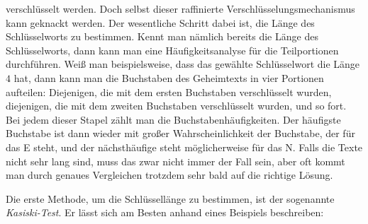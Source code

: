 \documentclass{zusammenfassung}
\begin{document}
verschlüsselt werden. Doch selbst dieser raffinierte Verschlüsselungsmechanismus kann geknackt werden. Der wesentliche Schritt 
dabei ist, die Länge des Schlüsselworts zu bestimmen. Kennt man nämlich bereits die Länge des Schlüsselworts, dann kann man eine
Häufigkeitsanalyse für die Teilportionen durchführen. Weiß man beispielsweise, dass das gewählte Schlüsselwort die Länge $4$ hat,
dann kann man die Buchstaben des Geheimtexts in vier Portionen aufteilen: Diejenigen, die mit dem ersten Buchstaben verschlüsselt
wurden, diejenigen, die mit dem zweiten Buchstaben verschlüsselt wurden, und so fort. Bei jedem dieser Stapel zählt man die
Buchstabenhäufigkeiten. Der häufigste Buchstabe ist dann wieder mit großer Wahrscheinlichkeit der Buchstabe, der für das E steht,
und der nächsthäufige steht möglicherweise für das N. Falls die Texte nicht sehr lang sind, muss das zwar nicht immer der Fall
sein, aber oft kommt man durch genaues Vergleichen trotzdem sehr bald auf die richtige Lösung.

Die erste Methode, um die Schlüssellänge zu bestimmen, ist der sogenannte \emph{Kasiski-Test}. Er lässt sich am Besten anhand
eines Beispiels beschreiben:

\begin{center}
\end{center}
\end{document}
